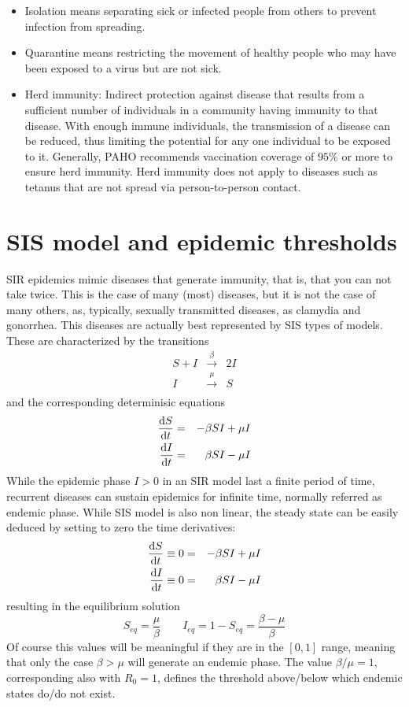 \begin{itemize}
\item Isolation means separating sick or infected people from others to prevent infection from
spreading.
\item Quarantine means restricting the movement of healthy people who may have
been exposed to a virus but are not sick.
\item Herd immunity: Indirect protection against disease that results from a sufficient number
of individuals in a community having immunity to that disease. With enough immune individuals, the transmission of a disease can be reduced, thus limiting the potential for any one individual to be exposed to it. Generally, PAHO recommends vaccination coverage of $95\%$ or more to ensure herd immunity. Herd immunity does not apply to diseases such as tetanus that are
not spread via person-to-person contact.
\end{itemize}

\section{SIS model and epidemic thresholds}

SIR epidemics mimic diseases that generate immunity, that is, that you can not take twice. This is the case of many (most) diseases, but it is not the case of many others, as, typically, sexually transmitted diseases, as clamydia and gonorrhea. This diseases are actually best represented by SIS types of models. These are characterized by the transitions
\begin{eqnarray*}
 S + I &\xrightarrow{\beta}& 2I \\
 I &\xrightarrow{\mu}& S \\
\end{eqnarray*}
and the corresponding determinisic equations
\begin{eqnarray}
\frac{\mathrm{d} S}{\mathrm{d} t} &=& -\beta SI   + \mu I\nonumber \\
\frac{\mathrm{d} I}{\mathrm{d} t} &=& \beta SI - \mu I  \label{eq:SIS}
\end{eqnarray}
While the epidemic phase $I > 0$ in an SIR model last a finite period of time, recurrent diseases can sustain epidemics for infinite time, normally referred as endemic phase. While SIS model is also non linear, the steady state can be easily deduced by setting to zero the time derivatives:
\begin{eqnarray}
\frac{\mathrm{d} S}{\mathrm{d} t}\equiv 0 &=& -\beta SI   + \mu I\nonumber \\
\frac{\mathrm{d} I}{\mathrm{d} t}\equiv  0  &=& \beta SI - \mu I  \label{eq:SIS}
\end{eqnarray}
resulting in the equilibrium solution
\[ S_{eq} = \frac \mu  \beta \qquad  I_{eq} = 1-S_{eq} = \frac{\beta - \mu } \beta\]
Of course this values will be meaningful if they are in the $[0,1]$ range, meaning that only the case $\beta > \mu$ will generate an endemic phase.
The value $\beta / \mu = 1$, corresponding also with $R_0=1$, defines the threshold above/below which endemic states do/do not exist.

